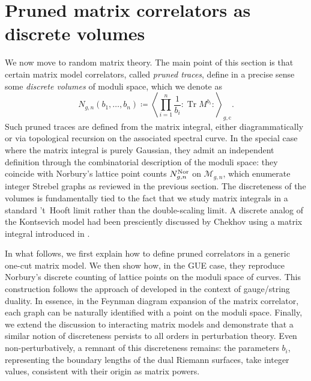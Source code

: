 \documentclass[a4paper,11pt,english]{article}
\theoremstyle{plain}
\theoremstyle{definition}
\theoremstyle{plain}
\newcommand{\cc}{\mathrm{c}}
\DeclareMathOperator{\Tr}{Tr}
\newcommand{\normord}[1]{:\mathrel{#1}:}
\newcommand{\NTr}[1]{\normord{\Tr{#1}}}
\newcommand{\M}{\mathcal{M}}
\begin{document}
\section{Pruned matrix correlators as discrete volumes}
\label{sec:matrix}
We now move to random matrix theory. The main point of this section is that certain matrix model correlators, called \emph{pruned traces}, define in a precise sense some \emph{discrete volumes} of moduli space, which we denote as
\begin{equation} \label{eq:mdiscvols}
    N_{g,n}(b_1,\ldots,b_n)
    \coloneqq
    \left\langle \prod_{i=1}^n \frac{1}{b_{i}} \NTr{M^{b_i}} \right\rangle_{\!\!g,\cc} .
\end{equation}
Such pruned traces are defined from the matrix integral, either diagrammatically or via topological recursion on the associated spectral curve. In the special case where the matrix integral is purely Gaussian, they admit an independent definition through the combinatorial description of the moduli space: they coincide with Norbury's lattice point counts $N^{\textup{Nor}}_{g,n}$ on $\M_{g,n}$, which enumerate integer Strebel graphs as reviewed in the previous section. The discreteness of the volumes is fundamentally tied to the fact that we study matrix integrals in a standard 't~Hooft limit rather than the double-scaling limit. A discrete analog of the Kontsevich model \cite{Kon92} had been presciently discussed by Chekhov \cite{ChekhovDisc} using a matrix integral introduced in \cite{ChekhovMakeenkoKP}.

In what follows, we first explain how to define pruned correlators in a generic one-cut matrix model. We then show how, in the GUE case, they reproduce Norbury's discrete counting of lattice points on the moduli space of curves. This construction follows the approach of \cite{Gop04a,Gop04b,Gop05} developed in the context of gauge/string duality. In essence, in the Feynman diagram expansion of the matrix correlator, each graph can be naturally identified with a point on the moduli space. Finally, we extend the discussion to interacting matrix models and demonstrate that a similar notion of discreteness persists to all orders in perturbation theory. Even non-perturbatively, a remnant of this discreteness remains: the parameters $b_i$, representing the boundary lengths of the dual Riemann surfaces, take integer values, consistent with their origin as matrix powers.

\end{document}
